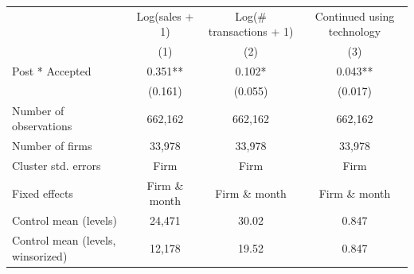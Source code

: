 \begin{tabular}[t]{lccc}
\toprule
  & Log(sales + 1) & Log(\# transactions + 1) & Continued using technology\\
& (1) & (2) & (3)\\
\midrule
Post * Accepted & 0.351** & 0.102* & 0.043**\\
 & (0.161) & (0.055) & (0.017)\\
\midrule
Number of observations & 662,162 & 662,162 & 662,162\\
Number of firms & 33,978 & 33,978 & 33,978\\
Cluster std. errors & Firm & Firm & Firm\\
Fixed effects & Firm \& month & Firm \& month & Firm \& month\\
Control mean (levels) & 24,471 & 30.02 & 0.847\\
Control mean (levels, winsorized) & 12,178 & 19.52 & 0.847\\
\bottomrule
\end{tabular}

